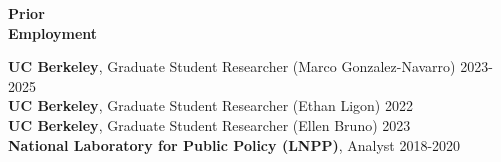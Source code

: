 \documentclass[10pt, oneside]{article}
\begin{document}
\begin{minipage}[t]{0.1\linewidth}
\textbf{Prior \\ Employment}
\end{minipage}\hspace{0.05\linewidth}
\begin{minipage}[t]{0.8\linewidth}
\textbf{UC Berkeley}, Graduate Student Researcher (Marco Gonzalez-Navarro) \hfill 2023-2025 \\
\textbf{UC Berkeley}, Graduate Student Researcher (Ethan Ligon) \hfill 2022 \\
\textbf{UC Berkeley}, Graduate Student Researcher (Ellen Bruno) \hfill 2023 \\
\textbf{National Laboratory for Public Policy (LNPP)}, Analyst \hfill 2018-2020 \\
\end{minipage}\vspace{5mm}

\begin{minipage}[t]{0.1\linewidth}
\textbf{}
\end{minipage}\hspace{0.05\linewidth}
\hspace{0.05\linewidth}
\begin{minipage}[t]{0.8\linewidth}


\end{minipage}\vspace{5mm}
\end{document}
